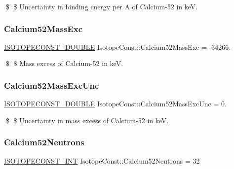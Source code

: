 \$ \$ Uncertainty in binding energy per A of Calcium-\/52 in keV. \mbox{\label{group___isotope_const-_calcium-_ca52_gaec3da509aafbbbe0e9dc53616f8c7cc4}} 
\subsubsection{\texorpdfstring{Calcium52\+Mass\+Exc}{Calcium52MassExc}}
{\footnotesize\ttfamily \mbox{\hyperlink{group___isotope_const-_macros_ga8f45a7272ce02c0b4c65c44636ed719a}{I\+S\+O\+T\+O\+P\+E\+C\+O\+N\+S\+T\+\_\+\+D\+O\+U\+B\+LE}} Isotope\+Const\+::\+Calcium52\+Mass\+Exc = -\/34266.}

\$ \$ Mass excess of Calcium-\/52 in keV. \mbox{\label{group___isotope_const-_calcium-_ca52_gae80e1f72c807f5701854f8c3dcabdb0b}} 
\subsubsection{\texorpdfstring{Calcium52\+Mass\+Exc\+Unc}{Calcium52MassExcUnc}}
{\footnotesize\ttfamily \mbox{\hyperlink{group___isotope_const-_macros_ga8f45a7272ce02c0b4c65c44636ed719a}{I\+S\+O\+T\+O\+P\+E\+C\+O\+N\+S\+T\+\_\+\+D\+O\+U\+B\+LE}} Isotope\+Const\+::\+Calcium52\+Mass\+Exc\+Unc = 0.}

\$ \$ Uncertainty in mass excess of Calcium-\/52 in keV. \mbox{\label{group___isotope_const-_calcium-_ca52_ga81fc1cfe178861a2fa810e350cb314fe}} 
\subsubsection{\texorpdfstring{Calcium52\+Neutrons}{Calcium52Neutrons}}
{\footnotesize\ttfamily \mbox{\hyperlink{group___isotope_const-_macros_ga5f18360b3e99483a35c32d789e62621c}{I\+S\+O\+T\+O\+P\+E\+C\+O\+N\+S\+T\+\_\+\+I\+NT}} Isotope\+Const\+::\+Calcium52\+Neutrons = 32}

